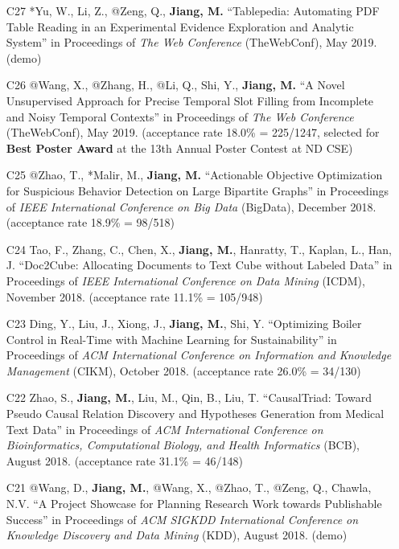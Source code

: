 \documentclass[10pt]{article}
\newenvironment{myindentpar}[1]%
{\begin{list}{}%
         {\setlength{\leftmargin}{#1}}%
         \item[]%
}
{\end{list}}
\newcounter{list}
\begin{document}
\begin{myindentpar}{0.00cm}
\begin{enumerate}[leftmargin=.5cm]
\item[C27] *Yu, W., Li, Z., @Zeng, Q., \textbf{Jiang, M.} ``Tablepedia: Automating PDF Table Reading in an Experimental Evidence Exploration and Analytic System'' in Proceedings of \textit{The Web Conference} (TheWebConf), May 2019. (demo)
	
\item[C26] @Wang, X., @Zhang, H., @Li, Q., Shi, Y., \textbf{Jiang, M.} ``A Novel Unsupervised Approach for Precise Temporal Slot Filling from Incomplete and Noisy Temporal Contexts'' in Proceedings of \textit{The Web Conference} (TheWebConf), May 2019. (acceptance rate 18.0\% = 225/1247, selected for \textbf{Best Poster Award} at the 13th Annual Poster Contest at ND CSE)

\item[C25] @Zhao, T., *Malir, M., \textbf{Jiang, M.} ``Actionable Objective Optimization for Suspicious Behavior Detection on Large Bipartite Graphs'' in Proceedings of \textit{IEEE International Conference on Big Data} (BigData), December 2018. (acceptance rate 18.9\% = 98/518)

\item[C24] Tao, F., Zhang, C., Chen, X., \textbf{Jiang, M.}, Hanratty, T., Kaplan, L., Han, J. ``Doc2Cube: Allocating Documents to Text Cube without Labeled Data'' in Proceedings of \textit{IEEE International Conference on Data Mining} (ICDM), November 2018. (acceptance rate 11.1\% = 105/948)

\item[C23] Ding, Y., Liu, J., Xiong, J., \textbf{Jiang, M.}, Shi, Y. ``Optimizing Boiler Control in Real-Time with Machine Learning for Sustainability'' in Proceedings of \textit{ACM International Conference on Information and Knowledge Management} (CIKM), October 2018. (acceptance rate 26.0\% = 34/130)

\item[C22] Zhao, S., \textbf{Jiang, M.}, Liu, M., Qin, B., Liu, T. ``CausalTriad: Toward Pseudo Causal Relation Discovery and Hypotheses Generation from Medical Text Data'' in Proceedings of \textit{ACM International Conference on Bioinformatics, Computational Biology, and Health Informatics} (BCB), August 2018. (acceptance rate 31.1\% = 46/148)

\item[C21] @Wang, D., \textbf{Jiang, M.}, @Wang, X., @Zhao, T., @Zeng, Q., Chawla, N.V. ``A Project Showcase for Planning Research Work towards Publishable Success'' in Proceedings of \textit{ACM SIGKDD International Conference on Knowledge Discovery and Data Mining} (KDD), August 2018. (demo)


\end{enumerate}
\end{myindentpar}
\end{document}
